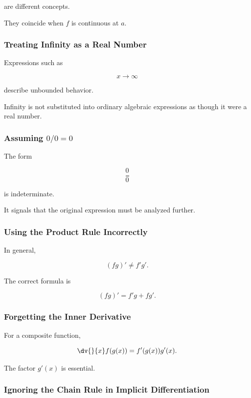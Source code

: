 are different concepts.

They coincide when \(f\) is continuous at \(a\).

\subsubsection{Treating Infinity as a Real Number}

Expressions such as

\[ x\to\infty \]

describe unbounded behavior.

Infinity is not substituted into ordinary algebraic expressions as though it
were a real number.

\subsubsection{Assuming \(0/0=0\)}

The form

\[ \frac00 \]

is indeterminate.

It signals that the original expression must be analyzed further.

\subsubsection{Using the Product Rule Incorrectly}

In general,

\[ (fg)'\neq f'g'. \]

The correct formula is

\[ (fg)'=f'g+fg'. \]

\subsubsection{Forgetting the Inner Derivative}

For a composite function,

\[ \dv{}{x}f(g(x))
=f'(g(x))g'(x). \]

The factor \(g'(x)\) is essential.

\subsubsection{Ignoring the Chain Rule in Implicit Differentiation}

